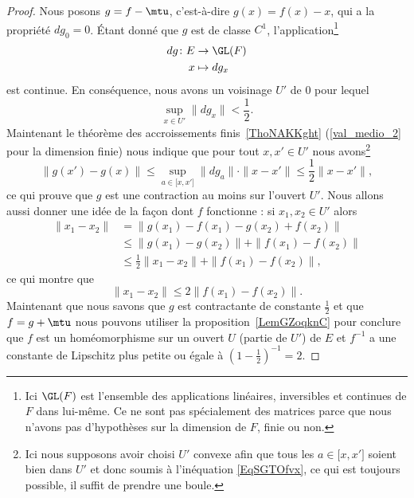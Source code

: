 \begin{proof}
	Nous posons \( g=f-\mtu\), c'est-à-dire \( g(x)=f(x)-x\), qui a la propriété \( dg_0=0\). Étant donné que \( g\) est de classe \( C^1\), l'application\footnote{Ici \( \GL(F)\) est l'ensemble des applications linéaires, inversibles et continues de \( F\) dans lui-même. Ce ne sont pas spécialement des matrices parce que nous n'avons pas d'hypothèses sur la dimension de \( F\), finie ou non.}
	\begin{equation}
		\begin{aligned}
			dg\colon  E & \to \GL(F)   \\
			x           & \mapsto dg_x
		\end{aligned}
	\end{equation}
	est continue. En conséquence, nous avons un voisinage \( U'\) de \( 0 \) pour lequel
	\begin{equation}    \label{EqSGTOfvx}
		\sup_{x\in U'}\| dg_x \|<\frac{ 1 }{2}.
	\end{equation}
	Maintenant le théorème des accroissements finis~\ref{ThoNAKKght} (\ref{val_medio_2} pour la dimension finie) nous indique que pour tout \( x,x'\in U'\) nous avons\footnote{Ici nous supposons avoir choisi \( U'\) convexe afin que tous les \( a\in \mathopen[ x , x' \mathclose]\) soient bien dans \( U'\) et donc soumis à l'inéquation \eqref{EqSGTOfvx}, ce qui est toujours possible, il suffit de prendre une boule.}
	\begin{equation}
		\| g(x')-g(x) \|\leq \sup_{a\in\mathopen[ x , x' \mathclose]}\| dg_a \| \cdot \| x-x' \|\leq \frac{ 1 }{2}\| x-x' \|,
	\end{equation}
	ce qui prouve que \( g\) est une contraction au moins sur l'ouvert \( U'\). Nous allons aussi donner une idée de la façon dont \( f\) fonctionne : si \( x_1,x_2\in U'\) alors
	\begin{subequations}
		\begin{align}
			\| x_1-x_2 \| & =   \| g(x_1)-f(x_1)-g(x_2)+f(x_2) \|                 \\
			              & \leq  \| g(x_1)-g(x_2) \|+\| f(x_1)-f(x_2) \|         \\
			              & \leq  \frac{ 1 }{2}\| x_1-x_2 \|+\| f(x_1)-f(x_2) \|,
		\end{align}
	\end{subequations}
	ce qui montre que
	\begin{equation}
		\| x_1-x_2 \|\leq 2\| f(x_1)-f(x_2) \|.
	\end{equation}
	Maintenant que nous savons que \( g\) est contractante de constante \( \frac{ 1 }{2}\) et que \( f=g+\mtu\) nous pouvons utiliser la proposition~\ref{LemGZoqknC} pour conclure que \( f\) est un homéomorphisme sur un ouvert \( U\) (partie de \( U'\)) de \( E\) et \( f^{-1}\) a une constante de Lipschitz plus petite ou égale à \( (1-\frac{ 1 }{2})^{-1}=2\).


\end{proof}
